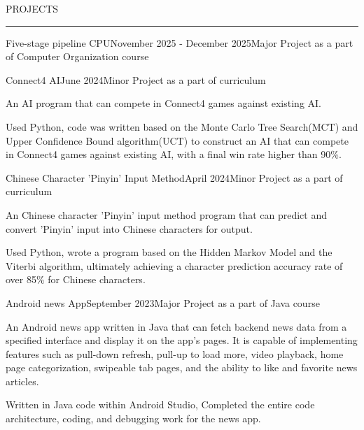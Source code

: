 \documentclass{resume} %
\renewenvironment{rSection}[1]{
\sectionskip
\textcolor{TsinghuaPurple}{\MakeUppercase{#1}}
\sectionlineskip
\hrule
\begin{list}{}{
\setlength{\leftmargin}{0em}
}
\item[]
}{
\end{list}
}
\begin{document}
\begin{rSection}{PROJECTS}
\begin{rSubsection}{Five-stage pipeline CPU}{November 2025 - December 2025}{Major Project as a part of Computer Organization course}{}
\end{rSubsection}



\begin{rSubsection}{Connect4 AI}{June 2024}{Minor Project as a part of curriculum}{}

\item An AI program that can compete in Connect4 games against existing AI.
\item Used Python, code was written based on the Monte Carlo Tree Search(MCT) and Upper Confidence Bound algorithm(UCT) to construct an AI that can compete in Connect4 games against existing AI, with a final win rate higher than 90\%. 

\end{rSubsection}


\begin{rSubsection}{Chinese Character 'Pinyin' Input Method}{April 2024}{Minor Project as a part of curriculum}{}    

\item An Chinese character 'Pinyin' input method program that can predict and convert 'Pinyin' input into Chinese characters for output.       
\item Used Python, wrote a program based on the Hidden Markov Model and the Viterbi algorithm, ultimately achieving a character prediction accuracy rate of over 85\% for Chinese characters.

\end{rSubsection} 

\end{rSection} 


\begin{rSubsection}{Android news App}{September 2023}{Major Project as a part of Java course}{}

\item An Android news app written in Java that can fetch backend news data from a specified interface and display it on the app's pages. It is capable of implementing features such as pull-down refresh, pull-up to load more, video playback, home page categorization, swipeable tab pages, and the ability to like and favorite news articles.
\item Written in Java code within Android Studio, Completed the entire code architecture, coding, and debugging work for the news app. 

\end{rSubsection}
\end{document}
